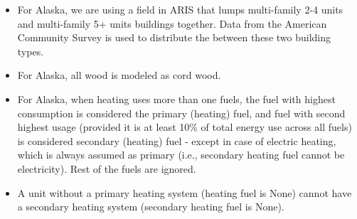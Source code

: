 \begin{itemize}
\item For Alaska, we are using a field in ARIS that lumps multi-family 2-4 units and multi-family 5+ units buildings together. Data from the American Community Survey is used to distribute the between these two building types.
\item For Alaska, all wood is modeled as cord wood.
\item For Alaska, when heating uses more than one fuels, the fuel with highest consumption is considered the primary (heating) fuel, and fuel with second highest usage (provided it is at least 10\% of total energy use across all fuels) is considered secondary (heating) fuel - except in case of electric heating, which is always assumed as primary (i.e., secondary heating fuel cannot be electricity). Rest of the fuels are ignored.
\item A unit without a primary heating system (heating fuel is None) cannot have a secondary heating system (secondary heating fuel is None).
\end{itemize}
